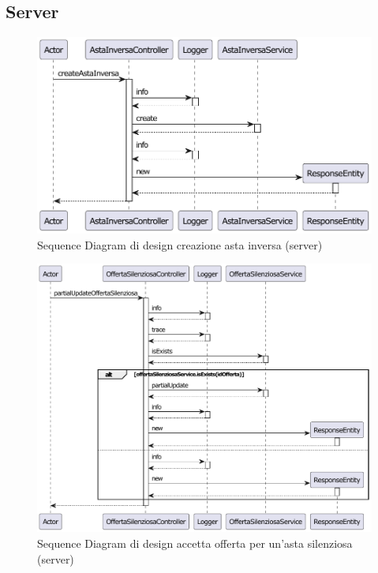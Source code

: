         \subsection{Server}
        \begin{figure}[htbp!]
            \centering
                \includegraphics[width=1\linewidth]{Immagini/Diagrammi/Sequence Diagram/Server Sequence Design/ServerSequenceCreaAstaDesign.pdf}
            \caption{Sequence Diagram di design creazione asta inversa (server)}
            \label{fig:Sequence Diagram di design creazione asta inversa (server)}
        \end{figure}
        \begin{figure}[htbp!]
            \centering
                \includegraphics[width=1\linewidth]{Immagini/Diagrammi/Sequence Diagram/Server Sequence Design/ServerSequenceAccettaOffertaDesign.pdf}
            \caption{Sequence Diagram di design accetta offerta per un'asta silenziosa (server)}
            \label{fig:Sequence Diagram di design accetta offerta per un'asta silenziosa (server)}
        \end{figure}
